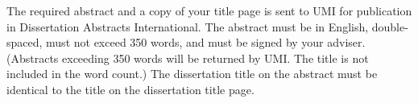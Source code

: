 
The required abstract and a copy of your title page is sent to UMI for
publication in Dissertation Abstracts International.  The abstract must be
in English, double-spaced, must not exceed 350 words, and must be signed by
your adviser.  (Abstracts exceeding 350 words will be returned by UMI.  The
title is not included in the word count.) The dissertation title on the
abstract must be identical to the title on the dissertation title page.  



